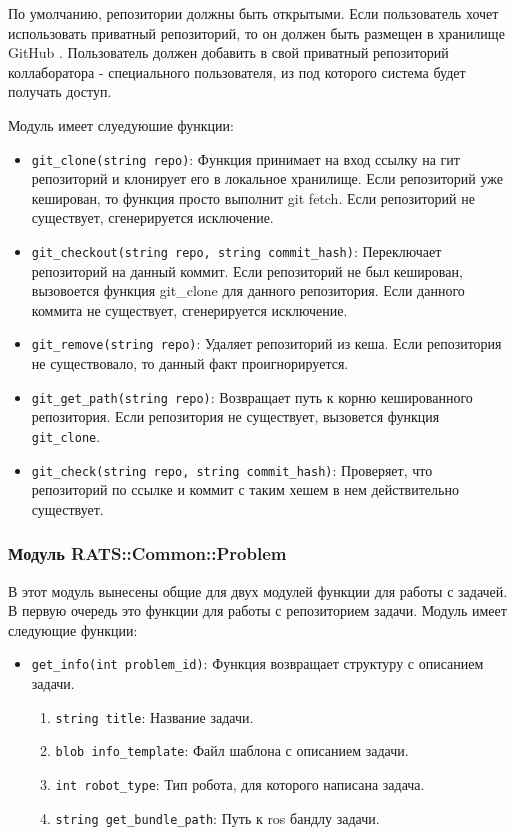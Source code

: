 \documentclass[a4paper,12pt]{article}
\begin{document}
По умолчанию, репозитории должны быть открытыми. Если пользователь хочет использовать приватный репозиторий, то он должен быть размещен в хранилище GitHub \cite{web:github}. Пользователь должен добавить в свой приватный репозиторий коллаборатора - специального пользователя, из под которого система будет получать доступ. 

Модуль имеет слуедуюшие функции:
\begin{itemize}
    \item \verb+git_clone(string repo)+: Функция принимает на вход ссылку на гит репозиторий и клонирует его в локальное хранилище. Если репозиторий уже кеширован, то функция просто выполнит git fetch. Если репозиторий не существует, сгенерируется исключение.
    \item \verb+git_checkout(string repo, string commit_hash)+: Переключает репозиторий на данный коммит. Если репозиторий не был кеширован, вызовоется функция git\_clone для данного репозитория. Если данного коммита не существует, сгенерируется исключение. 
    \item \verb+git_remove(string repo)+: Удаляет репозиторий из кеша. Если репозитория не существовало, то данный факт проигнорируется. 
    \item \verb+git_get_path(string repo)+: Возвращает путь к корню кешированного репозитория. Если репозитория не существует, вызовется функция \verb+git_clone+. 
    \item \verb+git_check(string repo, string commit_hash)+: Проверяет, что репозиторий по ссылке и коммит с таким хешем в нем действительно существует. 
\end{itemize}

\subsubsection{Модуль RATS::Common::Problem}
В этот модуль вынесены общие для двух модулей функции для работы с задачей. В первую очередь это функции для работы с репозиторием задачи. Модуль имеет следующие функции:

\begin{itemize}
    \item \verb+get_info(int problem_id)+: Функция возвращает структуру с описанием задачи. 
    \begin{enumerate}
        \item \verb+string title+: Название задачи.
        \item \verb+blob info_template+: Файл шаблона с описанием задачи.
        \item \verb+int robot_type+: Тип робота, для которого написана задача.
        \item \verb+string get_bundle_path+: Путь к ros бандлу задачи.
    \end{enumerate}
\end{itemize}
\end{document}
